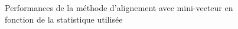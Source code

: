 \begin{appendices}
\begin{figure}[htb!]
\begin{center}
{       }
    \end{center}
    \caption{Performances de la m\'ethode d'alignement avec mini-vecteur en fonction de la statistique utilis\'ee}
    \label{fig:Precision_2_DL3}
  \end{figure}
% 
% 
%   
%    
%   
%   

\end{appendices}
